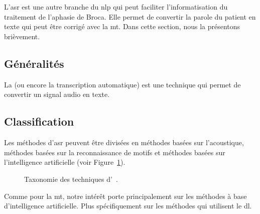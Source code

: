 \section{}

L'\gls{asr} est une autre branche du \gls{nlp} 
qui peut faciliter l'informatisation du traitement de l'aphasie de Broca.
Elle permet de convertir la parole du patient en texte qui peut être corrigé avec la \gls{mt}.
Dans cette section, nous la présentons brièvement.


\subsection{Généralités}

La  (ou encore la transcription automatique) 
est une technique qui permet de convertir un signal audio en texte.


\subsection{Classification}

Les méthodes d'\gls{asr} peuvent être divisées en méthodes basées sur l'acoustique,
méthodes basées sur la reconnaissance de motifs
et méthodes basées sur l'intelligence artificielle (voir Figure~\ref{fig.asr-taxonomy-tree}).

\begin{figure}
    \centering
    \resizebox{\textwidth}{!}{}
    \caption[Taxonomie des techniques d'.]
    {Taxonomie des techniques d'~\cite{Volny_Novak_Zezula_2012}.}
    \label{fig.asr-taxonomy-tree}
\end{figure}

Comme pour la \gls{mt},
notre intérêt porte principalement sur les méthodes à base d'intelligence artificielle.
Plus spécifiquement sur les méthodes qui utilisent le \gls{dl}.